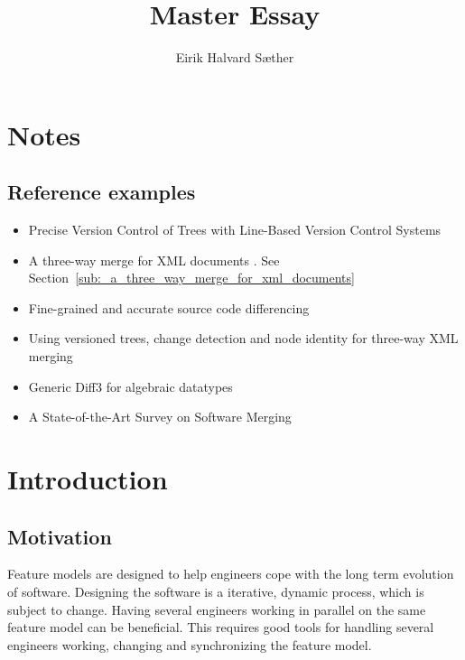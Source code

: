\documentclass[a4paper,english]{ifimaster}
\title{Master Essay}
\author{Eirik Halvard Sæther}
\begin{document}
\maketitle
\newpage

\frontmatter{}

\tableofcontents

\mainmatter{}

\chapter{Notes}

\section{Reference examples}%
\label{sec:reference_examples}

\begin{itemize}
	\item Precise Version Control of Trees with Line-Based Version Control Systems \cite{cite:precise_version_control_of_trees}
	\item A three-way merge for {XML} documents \cite{cite:lindholm_xml_merge}. See Section~\ref{sub:_a_three_way_merge_for_xml_documents}
	\item Fine-grained and accurate source code differencing \cite{cite:fine_grained_source_code_diff}
	\item Using versioned trees, change detection and node identity for three-way {XML} merging \cite{cite:cheng_ethan_xml_merge}
	\item Generic Diff3 for algebraic datatypes \cite{cite:generic_diff_for_adt}
	\item A State-of-the-Art Survey on Software Merging \cite{cite:tom_mens_software_merging_survey}


\end{itemize}

\chapter{Introduction}%
\label{cha:introduction}

\section{Motivation}%
\label{sec:motivation}

Feature models are designed to help engineers cope with the long term evolution of software. Designing the software is a iterative, dynamic process, which is subject to change. Having several engineers working in parallel on the same feature model can be beneficial. This requires good tools for handling several engineers working, changing and synchronizing the feature model.
\end{document}
